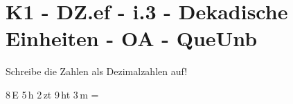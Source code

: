 \section{K1 - DZ.ef - i.3 - Dekadische Einheiten - OA - QueUnb}

\begin{beispiel}{0} %
				Schreibe die Zahlen als Dezimalzahlen auf!\leer
					
					8\,E 5\,h 2\,zt 9\,ht 3\,m = 
\end{beispiel}